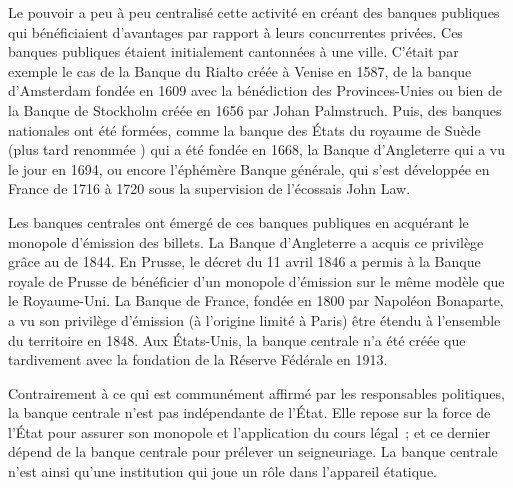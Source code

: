 Le pouvoir a peu à peu centralisé cette activité en créant des banques publiques qui bénéficiaient d'avantages par rapport à leurs concurrentes privées. Ces banques publiques étaient initialement cantonnées à une ville. C'était par exemple le cas de la Banque du Rialto créée à Venise en 1587, de la banque d'Amsterdam fondée en 1609 avec la bénédiction des Provinces-Unies ou bien de la Banque de Stockholm créée en 1656 par Johan Palmstruch. Puis, des banques nationales ont été formées, comme la banque des États du royaume de Suède (plus tard renommée ) qui a été fondée en 1668, la Banque d'Angleterre qui a vu le jour en 1694, ou encore l'éphémère Banque générale, qui s'est développée en France de 1716 à 1720 sous la supervision de l'écossais John Law. %

Les banques centrales ont émergé de ces banques publiques en acquérant le monopole d'émission des billets. La Banque d'Angleterre a acquis ce privilège grâce au  de 1844. En Prusse, le décret du 11 avril 1846 a permis à la Banque royale de Prusse de bénéficier d'un monopole d'émission sur le même modèle que le Royaume-Uni. La Banque de France, fondée en 1800 par Napoléon Bonaparte, a vu son privilège d'émission (à l'origine limité à Paris) être étendu à l'ensemble du territoire en 1848. Aux États-Unis, la banque centrale n'a été créée que tardivement avec la fondation de la Réserve Fédérale en 1913.

Contrairement à ce qui est communément affirmé par les responsables politiques, la banque centrale n'est pas indépendante de l'État. Elle repose sur la force de l'État pour assurer son monopole et l'application du cours légal~; et ce dernier dépend de la banque centrale pour prélever un seigneuriage. La banque centrale n'est ainsi qu'une institution qui joue un rôle dans l'appareil étatique.

